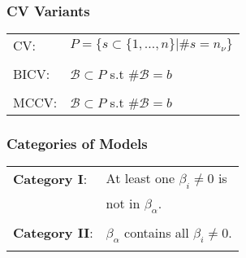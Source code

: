 \documentclass[20pt,mathserif]{beamer}
\begin{document}

\begin{frame}
\frametitle{CV Variants}
\setlength{\tabcolsep}{1pt}
\begin{tabular}{ll}
	CV:& $P=\{s\subset\{1,\ldots,n\}|\#s= n_\nu\}$\\\\
	BICV:& $\mathcal{B}\subset P $ s.t $\# \mathcal{B}=b$\\\\
	MCCV:& $\mathcal{B}\subset P$ s.t $\# \mathcal{B}=b$
\end{tabular}
\end{frame}

\begin{frame}
\frametitle{Categories of Models}
\setlength{\tabcolsep}{1pt}
\begin{tabular}{ll}
	{\bfseries Category I}:& At least one $\beta_i\neq0$ is \\&not in $\beta_\alpha$.\\\\
	{\bfseries Category II}:& $\beta_\alpha$ contains all $\beta_i\neq0$.\\\\
\end{tabular}
\end{frame}
\end{document}
